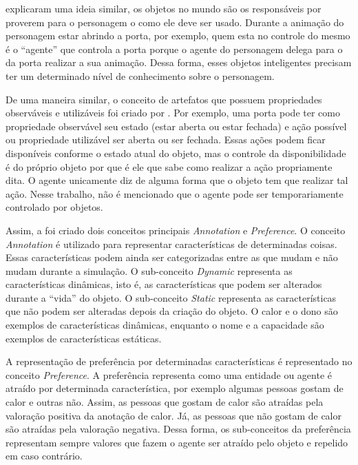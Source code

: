 \citet{kallmann1999modeling} explicaram uma ideia similar, os objetos no mundo
são os responsáveis por proverem para o personagem o como ele deve ser usado.
Durante a animação do personagem estar abrindo a porta, por exemplo, quem esta
no controle do mesmo é o ``agente'' que controla a porta porque o agente do
personagem delega para o da porta realizar a sua animação. Dessa forma,
esses objetos inteligentes precisam ter um determinado nível de conhecimento
sobre o personagem.

De uma maneira similar, o conceito de artefatos que possuem propriedades
observáveis e utilizáveis foi criado por \citet{ricci31cartago}. Por exemplo,
uma porta pode ter como propriedade observável seu estado (estar aberta ou
estar fechada) e ação possível ou propriedade utilizável ser aberta ou ser
fechada. Essas ações podem ficar disponíveis conforme o estado atual do
objeto, mas o controle da disponibilidade é do próprio objeto por que é ele
que sabe como realizar a ação propriamente dita. O agente unicamente diz de
alguma forma que o objeto tem que realizar tal ação. Nesse trabalho, não é
mencionado que o agente pode ser temporariamente controlado por objetos.

Assim, a foi criado dois conceitos principais \emph{Annotation} e
\emph{Preference}. O conceito \emph{Annotation} é utilizado para representar
características de determinadas coisas. Essas características podem ainda
ser categorizadas entre as que mudam e não mudam durante a simulação. O
sub-conceito \emph{Dynamic} representa as características dinâmicas, isto é,
as características que podem ser alterados durante a ``vida'' do objeto. O
sub-conceito \emph{Static} representa as características que não podem ser
alteradas depois da criação do objeto. O calor e o dono são exemplos de
características dinâmicas, enquanto o nome e a capacidade são exemplos de
características estáticas.

A representação de preferência por determinadas características é representado
no conceito \emph{Preference}. A preferência representa como uma entidade ou
agente é atraído por determinada característica, por exemplo algumas pessoas
gostam de calor e outras não. Assim, as pessoas que gostam de calor são
atraídas pela valoração positiva da anotação de calor. Já, as pessoas que não
gostam de calor são atraídas pela valoração negativa. Dessa forma, os
sub-conceitos da preferência representam sempre valores que fazem o agente ser
atraído pelo objeto e repelido em caso contrário.

